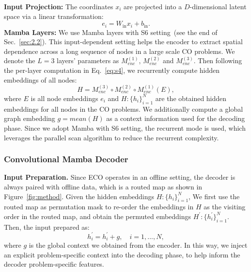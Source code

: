\documentclass{article}
\theoremstyle{plain}
\theoremstyle{definition}
\theoremstyle{remark}
\begin{document}
\textbf{Input Projection:} The coordinates $x_i$ are projected into a $D$-dimensional latent space via a linear transformation: 
\begin{equation}
    e_i = W_{\text{in}} x_i + b_{\text{in}}.
\end{equation}
\textbf{Mamba Layers:} We use Mamba layers with S6 setting~(see the end of Sec.~\ref{sec:2.2}). This input-dependent setting helps the encoder to extract spatial dependence across a long sequence of nodes in a large scale CO problems. We denote the $L=3$ layers' parameters as $M_{enc}^{(1)}$, $M_{enc}^{(2)}$ and $M_{enc}^{(3)}$. Then following the per-layer computation in Eq.~\ref{eq:s4}, we recurrently compute hidden embeddings of all nodes:
\begin{equation}
    H = M_{enc}^{(3)} \circ M_{enc}^{(2)} \circ M_{enc}^{(1)}(E),
\end{equation}
where $E$ is all node embeddings $e_i$ and $H:\{h_i\}_{i=1}^{N}$ are the obtained hidden embeddings for all nodes in the CO problems. We additionally compute a global graph embedding $g = mean(H)$ as a context information used for the decoding phase. Since we adopt Mamba with S6 setting, the recurrent mode is used, which leverages the parallel scan algorithm to reduce the recurrent complexity.




\subsubsection{Convolutional Mamba Decoder}
\textbf{Input Preparation.} Since ECO operates in an offline setting, the decoder is always paired with offline data, which is a routed map as shown in Figure~\ref{fig:method}. Given the hidden embeddings $H:\{h_i\}_{i=1}^{N}$, We first use the routed map as permutation mask to re-order the embeddings in $H$ as the visiting order in the routed map, and obtain the permuted embeddings $H^\prime:\{h^\prime_i\}_{i=1}^{N}$. Then, the input prepared as:
\begin{equation}
    h^\prime_i = h^\prime_i + g, \quad i=1,...,N,
\end{equation}
where $g$ is the global context we obtained from the encoder. In this way, we inject an explicit problem-specific context into the decoding phase, to help inform the decoder problem-specific features.
\end{document}
